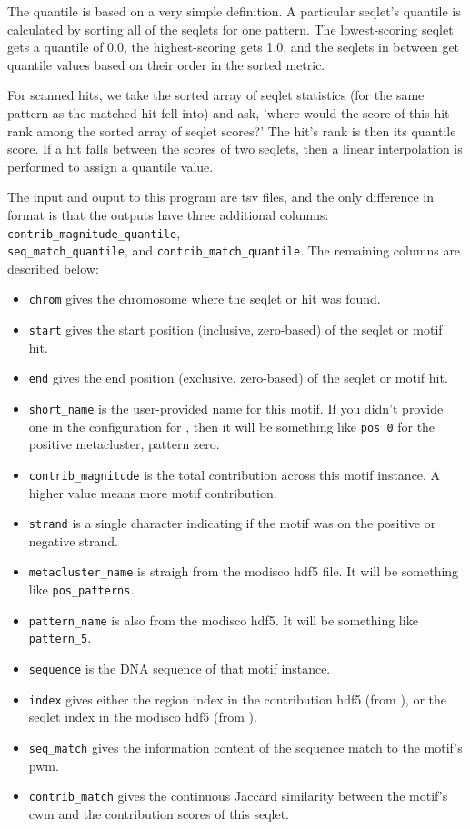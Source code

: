 \documentclass{article}
\begin{document}
The quantile is based on a very simple definition. A particular seqlet's quantile is calculated by
sorting all of the seqlets for one pattern. The lowest-scoring seqlet gets a quantile of 0.0,
the highest-scoring gets 1.0, and the seqlets in between get quantile values based on their
order in the sorted metric.

For scanned hits, we take the sorted array of seqlet statistics (for the same pattern
as the matched hit fell into) and ask, 'where would the score of this hit rank among
the sorted array of seqlet scores?'
The hit's rank is then its quantile score.
If a hit falls between the scores of two seqlets, then a linear interpolation
is performed to assign a quantile value.

The input and ouput to this program are tsv files, and the only difference in format
is that the outputs have three additional columns: \texttt{contrib\_magnitude\_quantile},\\
\texttt{seq\_match\_quantile}, and
\texttt{contrib\_match\_quantile}.
The remaining columns are described below:

\begin{itemize}
    \item \texttt{chrom} gives the chromosome where the seqlet or hit was found.
    \item \texttt{start} gives the start position (inclusive, zero-based) of the seqlet or
        motif hit.
    \item \texttt{end} gives the end position (exclusive, zero-based) of the seqlet or motif hit.
    \item \texttt{short\_name} is the user-provided name for this motif. If you didn't provide
        one in the configuration for , then it will be something like \texttt{pos\_0}
        for the positive metacluster, pattern zero.
    \item \texttt{contrib\_magnitude} is the total contribution across this motif instance.
        A higher value means more motif contribution.
    \item \texttt{strand} is a single character indicating if the motif was on the positive
        or negative strand.
    \item \texttt{metacluster\_name} is straigh from the modisco hdf5 file. It will be
        something like \texttt{pos\_patterns}.
    \item \texttt{pattern\_name} is also from the modisco hdf5. It will be something
        like \texttt{pattern\_5}.
    \item \texttt{sequence} is the DNA sequence of that motif instance.
    \item \texttt{index} gives either the region index in the contribution hdf5
        (from ), or the seqlet index in the modisco
        hdf5 (from ).
    \item \texttt{seq\_match} gives the information content of the sequence match to the motif's
        pwm.
    \item \texttt{contrib\_match} gives the continuous Jaccard similarity between the motif's
        cwm and the contribution scores of this seqlet.
\end{itemize}
\end{document}

